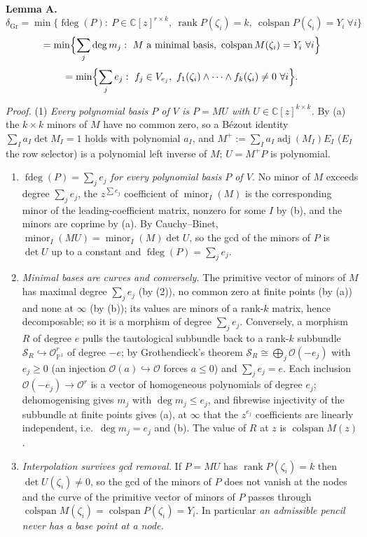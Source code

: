 \documentclass[
  11pt,
  a4paper,
]{article}
\newcounter{none} %
\begin{document}
\textbf{Lemma A.}
\[\delta_{\mathrm{Gr}}=\min\{\operatorname{fdeg}(P):\ P\in\mathbb C[z]^{r\times k},\ \operatorname{rank}P(\zeta_i)=k,\ \operatorname{colspan}P(\zeta_i)=Y_i\ \forall i\}\]
\[=\min\Bigl\{\sum_j\deg m_j:\ M\ \text{a minimal basis},\ \operatorname{colspan}M(\zeta_i)=Y_i\ \forall i\Bigr\}\]
\[=\min\Bigl\{\sum_je_j:\ f_j\in V_{e_j},\ f_1(\zeta_i)\wedge\dots\wedge f_k(\zeta_i)\ne0\ \forall i\Bigr\}.\]

\emph{Proof.} (1) \emph{Every polynomial basis \(P\) of \(V\) is
\(P=MU\) with \(U\in\mathbb C[z]^{k\times k}\).} By (a) the
\(k\times k\) minors of \(M\) have no common zero, so a Bézout identity
\(\sum_Ia_I\det M_I=1\) holds with polynomial \(a_I\), and
\(M^+:=\sum_Ia_I\operatorname{adj}(M_I)E_I\) (\(E_I\) the row selector)
is a polynomial left inverse of \(M\); \(U=M^+P\) is polynomial.

\begin{enumerate}
\def\labelenumi{(\arabic{enumi})}
\setcounter{enumi}{1}
\item
  \emph{\(\operatorname{fdeg}(P)=\sum_je_j\) for every polynomial basis
  \(P\) of \(V\).} No minor of \(M\) exceeds degree \(\sum_je_j\), the
  \(z^{\sum e_j}\) coefficient of \(\operatorname{minor}_I(M)\) is the
  corresponding minor of the leading-coefficient matrix, nonzero for
  some \(I\) by (b), and the minors are coprime by (a). By
  Cauchy--Binet,
  \(\operatorname{minor}_I(MU)=\operatorname{minor}_I(M)\det U\), so the
  gcd of the minors of \(P\) is \(\det U\) up to a constant and
  \(\operatorname{fdeg}(P)=\sum_je_j\).
\item
  \emph{Minimal bases are curves and conversely.} The primitive vector
  of minors of \(M\) has maximal degree \(\sum_je_j\) (by (2)), no
  common zero at finite points (by (a)) and none at \(\infty\) (by (b));
  its values are minors of a rank-\(k\) matrix, hence decomposable; so
  it is a morphism of degree \(\sum_je_j\). Conversely, a morphism \(R\)
  of degree \(e\) pulls the tautological subbundle back to a rank-\(k\)
  subbundle \(\mathcal S_R\hookrightarrow\mathcal O^r_{\mathbb P^1}\) of
  degree \(-e\); by Grothendieck's theorem
  \(\mathcal S_R\cong\bigoplus_j\mathcal O(-e_j)\) with \(e_j\ge0\) (an
  injection \(\mathcal O(a)\hookrightarrow\mathcal O\) forces \(a\le0\))
  and \(\sum_je_j=e\). Each inclusion
  \(\mathcal O(-e_j)\to\mathcal O^r\) is a vector of homogeneous
  polynomials of degree \(e_j\); dehomogenising gives \(m_j\) with
  \(\deg m_j\le e_j\), and fibrewise injectivity of the subbundle at
  finite points gives (a), at \(\infty\) that the \(z^{e_j}\)
  coefficients are linearly independent, i.e.~\(\deg m_j=e_j\) and (b).
  The value of \(R\) at \(z\) is \(\operatorname{colspan}M(z)\).
\item
  \emph{Interpolation survives gcd removal.} If \(P=MU\) has
  \(\operatorname{rank}P(\zeta_i)=k\) then \(\det U(\zeta_i)\ne0\), so
  the gcd of the minors of \(P\) does not vanish at the nodes and the
  curve of the primitive vector of minors of \(P\) passes through
  \(\operatorname{colspan}M(\zeta_i)=\operatorname{colspan}P(\zeta_i)=Y_i\).
  In particular \emph{an admissible pencil never has a base point at a
  node.}
\end{enumerate}
\end{document}
